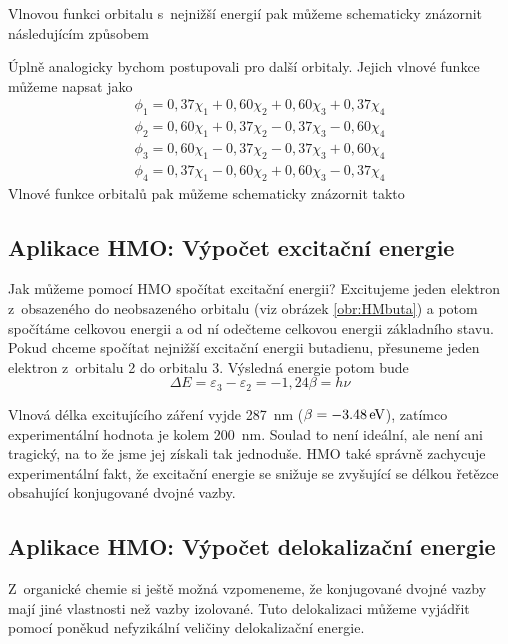 Vlnovou funkci orbitalu s~nejnižší energií pak můžeme schematicky znázornit následujícím způsobem


Úplně analogicky bychom postupovali pro další orbitaly. Jejich vlnové funkce můžeme napsat jako
\begin{equation}
\begin{split}
\phi_1 = 0{,}37\chi_1+0{,}60\chi_2+0{,}60\chi_3+0{,}37\chi_4 \\
\phi_2 = 0{,}60\chi_1+0{,}37\chi_2-0{,}37\chi_3-0{,}60\chi_4 \\
\phi_3 = 0{,}60\chi_1-0{,}37\chi_2-0{,}37\chi_3+0{,}60\chi_4 \\
\phi_4 = 0{,}37\chi_1-0{,}60\chi_2+0{,}60\chi_3-0{,}37\chi_4 
\end{split}
\end{equation}
%
Vlnové funkce orbitalů pak můžeme schematicky znázornit takto

 
\subsection{Aplikace HMO: Výpočet excitační energie}

Jak můžeme pomocí HMO spočítat excitační energii? Excitujeme jeden elektron z~obsazeného do neobsazeného orbitalu (viz obrázek \ref{obr:HMbuta}) a potom spočítáme celkovou energii a od ní odečteme celkovou energii základního stavu. Pokud chceme spočítat nejnižší excitační energii butadienu, přesuneme jeden elektron z~orbitalu 2 do orbitalu 3. Výsledná energie potom bude
\begin{equation}
\Delta E = \varepsilon_3-\varepsilon_2 = -1{,}24 \beta = h\nu 
\end{equation}

Vlnová délka excitujícího záření vyjde \SI{287}{\nm} ($\beta = -\SI{3{,}48}{\eV}$), zatímco experimentální hodnota je kolem \SI{200}{\nm}.
Soulad to není ideální, ale není ani tragický, na to že jsme jej získali tak jednoduše. HMO také správně zachycuje experimentální fakt, že excitační energie se snižuje se zvyšující se délkou řetězce obsahující konjugované dvojné vazby.



\subsection{Aplikace HMO: Výpočet delokalizační energie}

Z~organické chemie si ještě možná vzpomeneme, že konjugované dvojné vazby mají jiné vlastnosti než vazby izolované.
Tuto delokalizaci můžeme vyjádřit pomocí poněkud nefyzikální veličiny delokalizační energie.

